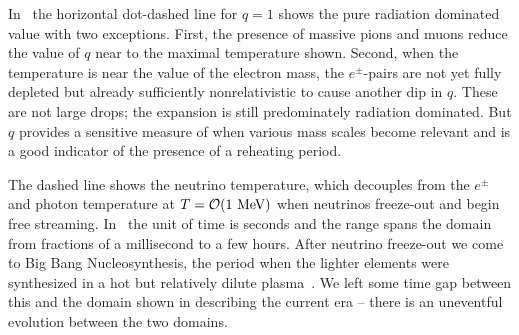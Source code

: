  In~ the horizontal dot-dashed line for $q=1$ shows the pure radiation dominated value with two exceptions. First, the presence of massive pions and muons reduce the value of $q$ near to the maximal temperature shown. Second, when the temperature is near the value of the electron mass, the $e^\pm$-pairs are not yet fully depleted but already sufficiently nonrelativistic to cause another dip in $q$. These are not large drops; the expansion is still predominately radiation dominated. But $q$ provides a sensitive measure of when various mass scales become relevant and is a good indicator of the presence of a reheating period.

 The dashed line shows the neutrino temperature, which decouples from the $e^\pm$ and photon temperature at $T={\cal O}(1\MeV)$ when neutrinos freeze-out and begin free streaming. In~ the unit of time is seconds and the range spans the domain from fractions of a millisecond to a few hours. After neutrino freeze-out we come to Big Bang Nucleosynthesis, the period when the lighter elements were synthesized in a hot but relatively dilute plasma~\cite{Iocco:2008va}. We left some time gap between this and the domain shown in  describing the current era -- there is an uneventful evolution between the two domains. 
 
